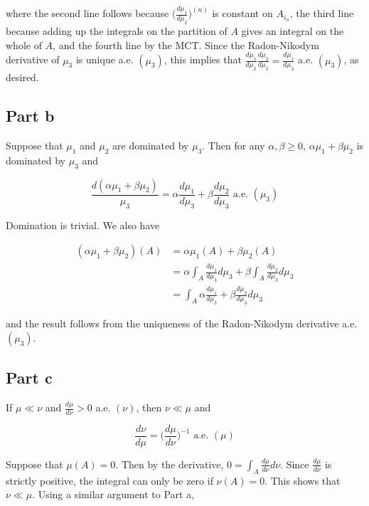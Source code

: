 \documentclass{article}
\begin{document}
where the second line follows because $\biggl( \frac{d\mu_1}{d\mu_2}\biggr)^{(n)}$ is constant on $A_{i_n}$, the third line because adding up the integrals on the partition of $A$ gives an integral on the whole of $A$, and the fourth line by the MCT. Since the Radon-Nikodym derivative of $\mu_3$ is unique a.e. $(\mu_3)$, this implies that $\frac{d\mu_1}{d\mu_2} \frac{d\mu_2}{d\mu_3} = \frac{d\mu_1}{d\mu_3}$ a.e. $(\mu_3)$, as desired.

\subsection*{Part b}

Suppose that $\mu_1$ and $\mu_2$ are dominated by $\mu_3$. Then for any $\alpha, \beta \geq 0$, $\alpha\mu_1 + \beta\mu_2$ is dominated by $\mu_3$ and

\[
\frac{d(\alpha\mu_1 + \beta\mu_2)}{\mu_3} = \alpha\frac{d\mu_1}{d\mu_3} + \beta\frac{d\mu_2}{d\mu_3} \text{ a.e. } (\mu_3)
\]

Domination is trivial. We also have

\begin{align*}
(\alpha\mu_1 + \beta\mu_2)(A) &= \alpha\mu_1(A) + \beta\mu_2(A) \\
&= \alpha\int_A \frac{d\mu_1}{d\mu_3}d\mu_3 + \beta\int_A \frac{d\mu_2}{d\mu_3}d\mu_3 \\
&= \int_A \alpha\frac{d\mu_1}{d\mu_3} + \beta\frac{d\mu_2}{d\mu_3} d\mu_3
\end{align*}

and the result follows from the uniqueness of the Radon-Nikodym derivative a.e. $(\mu_3)$.

\subsection*{Part c}

If $\mu \ll \nu$ and $\frac{d\mu}{d\nu} > 0$ a.e. $(\nu)$, then $\nu \ll \mu$ and

\[
\frac{d\nu}{d\mu} = \biggl( \frac{d\mu}{d\nu} \biggr)^{-1} \text{ a.e. } (\mu)
\]

Suppose that $\mu(A) = 0$. Then by the derivative, $0 = \int_A \frac{d\mu}{d\nu}d\nu$. Since $\frac{d\mu}{d\nu}$ is strictly positive, the integral can only be zero if $\nu(A) = 0$. This shows that $\nu \ll \mu$. Using a similar argument to Part a,
\end{document}
